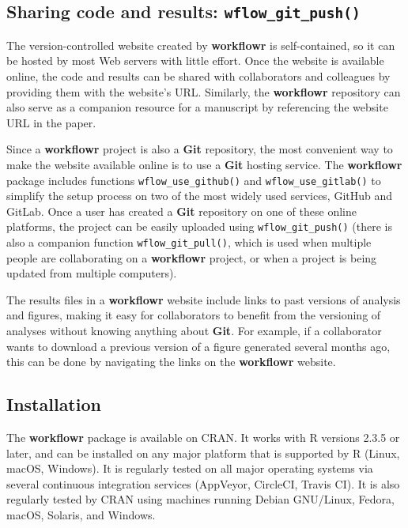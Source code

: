 \documentclass[9pt,a4paper]{extarticle}
\begin{document}
\subsection*{Sharing code and results: \texttt{wflow\_git\_push()}}

The version-controlled website created by \textbf{workflowr} is self-contained,
so it can be hosted by most Web servers with little effort. Once the
website is available online, the code and results can be shared with
collaborators and colleagues by providing them with the website's URL.
Similarly, the \textbf{workflowr} repository can also serve as a companion
resource for a manuscript by referencing the website URL in the paper.

Since a \textbf{workflowr} project is also a \textbf{Git} repository, the most convenient
way to make the website available online is to use a \textbf{Git} hosting
service. The \textbf{workflowr} package includes functions \texttt{wflow\_use\_github()} and
\texttt{wflow\_use\_gitlab()} to simplify the setup process on two of the most
widely used services, GitHub and GitLab. Once a user has created a \textbf{Git}
repository on one of these online platforms, the project can be easily
uploaded using \texttt{wflow\_git\_push()} (there is also a companion function
\texttt{wflow\_git\_pull()}, which is used when multiple people are collaborating
on a \textbf{workflowr} project, or when a project is being updated from multiple
computers).

The results files in a \textbf{workflowr} website include links to past versions
of analysis and figures, making it easy for collaborators to benefit
from the versioning of analyses without knowing anything about \textbf{Git}. For
example, if a collaborator wants to download a previous version of a
figure generated several months ago, this can be done by navigating the
links on the \textbf{workflowr} website.

\subsection*{Installation}

The \textbf{workflowr} package is available on CRAN. It works with R versions
2.3.5 or later, and can be installed on any major platform that is
supported by R (Linux, macOS, Windows). It is regularly tested on all
major operating systems via several continuous integration services
(AppVeyor, CircleCI, Travis CI). It is also regularly tested by CRAN
using machines running Debian GNU/Linux, Fedora, macOS, Solaris, and
Windows.
\end{document}
